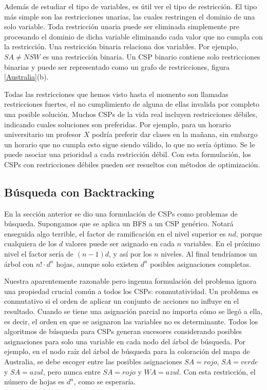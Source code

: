 Adem\'as de estudiar el tipo de variables, es \'util ver el tipo de restricci\'on. El tipo m\'as simple son las restricciones unarias, las cuales restringen el dominio de una solo variable. Toda restricci\'on unaria puede ser eliminada simplemente pre procesando el dominio de dicha variable eliminando cada valor que no cumpla con la restricci\'on. Una restricci\'on binaria relaciona dos variables. Por ejemplo, $SA \neq NSW$ es una restricci\'on binaria. Un CSP binario contiene solo restricciones binarias y puede ser representado como un grafo de restricciones, figura \ref{Australia}(b).

Todas las restricciones que hemos visto hasta el momento son llamadas restricciones fuertes, el no cumplimiento de alguna de ellas invalida por completo una posible soluci\'on. Muchos CSPs de la vida real incluyen restricciones d\'ebiles, indicando cuales soluciones son preferidas. Por ejemplo, para un horario universitario un profesor $X$ podr\'ia preferir dar clases en la mañana, sin embargo un horario que no cumpla esto sigue siendo v\'alido, lo que no ser\'ia \'optimo. Se le puede asociar una prioridad a cada restricci\'on d\'ebil. Con esta formulaci\'on, los CSPs con restricciones d\'ebiles pueden ser resueltos con m\'etodos de optimizaci\'on. 

\subsection{B\'usqueda con Backtracking}

En la secci\'on anterior se dio una formulaci\'on de CSPs como problemas de b\'usqueda. Supongamos que se aplica un BFS a un CSP gen\'erico. Notar\'a enseguida algo terrible, el factor de ramificaci\'on en el nivel superior es $nd$, porque cualquiera de los $d$ valores puede ser asignado en cada $n$ variables. En el pr\'oximo nivel el factor ser\'ia de $(n-1)d$, y as\'i por los $n$ niveles. Al final tendr\'iamos un \'arbol con $n! \cdot d^{n}$ hojas, aunque solo existen $d^{n}$ posibles asignaciones completas.

Nuestra aparentemente razonable pero ingenua formulaci\'on del problema ignora una propiedad crucial com\'un a todos los CSPs: conmutatividad. Un problema es conmutativo si el orden de aplicar un conjunto de acciones no influye en el resultado. Cuando se tiene una asignaci\'on parcial no importa c\'omo se lleg\'o a ella, es decir, el orden en que se asignaron las variables no es determinante. Todos los algoritmos de b\'usqueda para CSPs generan sucesores considerando posibles asignaciones para solo una variable en cada nodo del \'arbol de b\'usqueda. Por ejemplo, en el nodo ra\'iz del \'arbol de b\'usqueda para la coloraci\'on del mapa de Australia, se debe escoger entre las posibles asignaciones $SA = rojo$, $SA = verde$ y $SA = azul$, pero nunca entre $SA = rojo$ y $WA = azul$. Con esta restricci\'on, el n\'umero de hojas es $d^{n}$, como se esperar\'ia.

